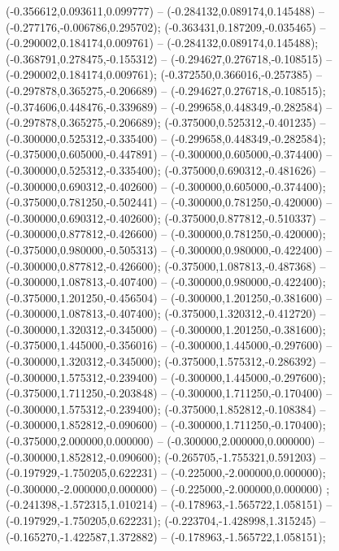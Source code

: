  (-0.356612,0.093611,0.099777) -- (-0.284132,0.089174,0.145488) -- (-0.277176,-0.006786,0.295702);
 (-0.363431,0.187209,-0.035465) -- (-0.290002,0.184174,0.009761) -- (-0.284132,0.089174,0.145488);
 (-0.368791,0.278475,-0.155312) -- (-0.294627,0.276718,-0.108515) -- (-0.290002,0.184174,0.009761);
 (-0.372550,0.366016,-0.257385) -- (-0.297878,0.365275,-0.206689) -- (-0.294627,0.276718,-0.108515);
 (-0.374606,0.448476,-0.339689) -- (-0.299658,0.448349,-0.282584) -- (-0.297878,0.365275,-0.206689);
 (-0.375000,0.525312,-0.401235) -- (-0.300000,0.525312,-0.335400) -- (-0.299658,0.448349,-0.282584);
 (-0.375000,0.605000,-0.447891) -- (-0.300000,0.605000,-0.374400) -- (-0.300000,0.525312,-0.335400);
 (-0.375000,0.690312,-0.481626) -- (-0.300000,0.690312,-0.402600) -- (-0.300000,0.605000,-0.374400);
 (-0.375000,0.781250,-0.502441) -- (-0.300000,0.781250,-0.420000) -- (-0.300000,0.690312,-0.402600);
 (-0.375000,0.877812,-0.510337) -- (-0.300000,0.877812,-0.426600) -- (-0.300000,0.781250,-0.420000);
 (-0.375000,0.980000,-0.505313) -- (-0.300000,0.980000,-0.422400) -- (-0.300000,0.877812,-0.426600);
 (-0.375000,1.087813,-0.487368) -- (-0.300000,1.087813,-0.407400) -- (-0.300000,0.980000,-0.422400);
 (-0.375000,1.201250,-0.456504) -- (-0.300000,1.201250,-0.381600) -- (-0.300000,1.087813,-0.407400);
 (-0.375000,1.320312,-0.412720) -- (-0.300000,1.320312,-0.345000) -- (-0.300000,1.201250,-0.381600);
 (-0.375000,1.445000,-0.356016) -- (-0.300000,1.445000,-0.297600) -- (-0.300000,1.320312,-0.345000);
 (-0.375000,1.575312,-0.286392) -- (-0.300000,1.575312,-0.239400) -- (-0.300000,1.445000,-0.297600);
 (-0.375000,1.711250,-0.203848) -- (-0.300000,1.711250,-0.170400) -- (-0.300000,1.575312,-0.239400);
 (-0.375000,1.852812,-0.108384) -- (-0.300000,1.852812,-0.090600) -- (-0.300000,1.711250,-0.170400);
 (-0.375000,2.000000,0.000000) -- (-0.300000,2.000000,0.000000) -- (-0.300000,1.852812,-0.090600);
 (-0.265705,-1.755321,0.591203) -- (-0.197929,-1.750205,0.622231) -- (-0.225000,-2.000000,0.000000);
 (-0.300000,-2.000000,0.000000) -- (-0.225000,-2.000000,0.000000) ;
 (-0.241398,-1.572315,1.010214) -- (-0.178963,-1.565722,1.058151) -- (-0.197929,-1.750205,0.622231);
 (-0.223704,-1.428998,1.315245) -- (-0.165270,-1.422587,1.372882) -- (-0.178963,-1.565722,1.058151);
